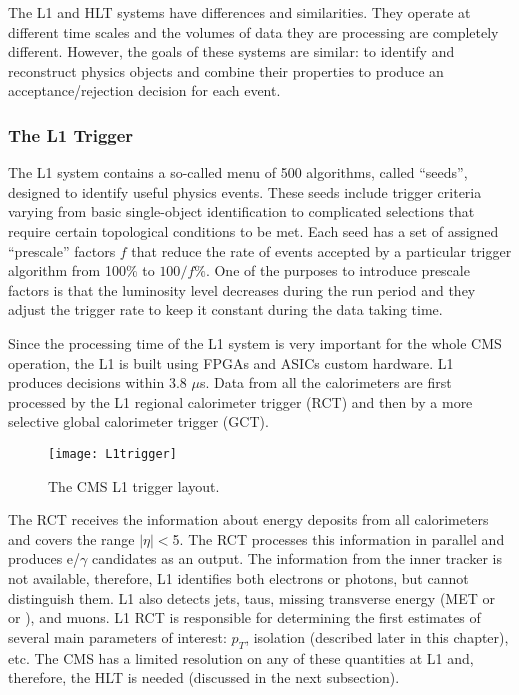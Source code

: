 \begin{normalsize}
The L1 and HLT systems have differences and similarities. They operate at different time scales and the volumes of data they are processing are completely different. However, the goals of these systems are similar: to identify and reconstruct physics objects and combine their properties to produce an acceptance/rejection decision for each event. 


\subsubsection{The L1 Trigger}


The L1 system \cite{CMS_TDR} contains a so-called menu of 500 algorithms, called ``seeds'', designed to identify useful physics events. These seeds include trigger criteria varying from basic single-object identification to complicated selections that require certain topological conditions to be met. Each seed has a set of assigned ``prescale'' factors $f$ that reduce the rate of events accepted by a particular trigger algorithm from 100$\%$ to $100/f\%$. One of the purposes to introduce prescale factors is that the luminosity level decreases during the run period and they adjust the trigger rate to keep it constant during the data taking time. 

Since the processing time of the L1 system is very important for the whole CMS operation, the L1 is built using FPGAs and ASICs custom hardware. L1 produces decisions within 3.8 $\mu$s. Data from all the calorimeters are first processed by the L1 regional calorimeter trigger (RCT) and then by a more selective global calorimeter trigger (GCT). 


 \begin{figure}[H]
  \centering
  \texttt{[image: L1trigger]}
  \caption[The CMS L1 trigger layout]{The CMS L1 trigger layout.}
  \label{L1trigger}
\end{figure}

The RCT receives the information about energy deposits from all calorimeters and covers the range $|\eta|<$5. The RCT processes this information in parallel and produces e/$\gamma$ candidates as an output. The information from the inner tracker is not available, therefore, L1 identifies both electrons or photons, but cannot distinguish them. L1 also detects jets, taus, missing transverse energy (MET or \ETslash or \PTslash), and muons. L1 RCT is responsible for determining the first estimates of several main parameters of interest: $p_T$, isolation (described later in this chapter), etc. The CMS has a limited resolution on any of these quantities at L1 and, therefore, the HLT is needed (discussed in the next subsection).


\end{normalsize}
